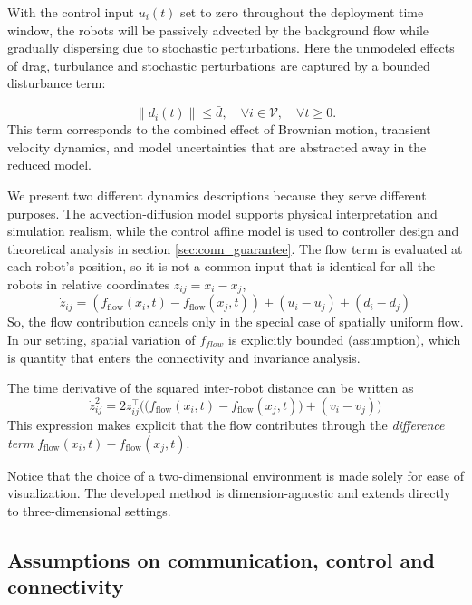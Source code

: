 \documentclass[conference]{IEEEconf}
\theoremstyle{plain}
\begin{document}
With the control input $u_i(t)$ set to zero throughout the deployment time window, the robots will be passively advected by the background flow while gradually dispersing due to stochastic perturbations. Here the unmodeled effects of drag, turbulance and stochastic perturbations are captured by a bounded disturbance term:

$$\|d_i(t)\| \le \bar{d}, \quad \forall i \in \mathcal{V}, \quad \forall t \ge 0. $$
This term corresponds to the combined effect of Brownian motion, transient velocity dynamics, and model uncertainties that are abstracted away in the reduced model.

We present two different dynamics descriptions because they serve different purposes. The advection-diffusion model supports physical interpretation and simulation realism, while the control affine model is used to controller design and theoretical analysis in section \ref{sec:conn_guarantee}. The flow term is evaluated at each robot's position, so it is not a common input that is identical for all the robots in relative coordinates ${z_{ij}} = {x_i} - {x_j}$,
\begin{equation*}
    \dot{z}_{ij} = (f_{\text{flow}}(x_i, t) - f_{\text{flow}}(x_j, t)) + (u_i - u_j) + (d_i - d_j)
\end{equation*}
So, the flow contribution cancels only in the special case of spatially uniform flow. In our setting, spatial variation of $f_{flow}$ is explicitly bounded (assumption), which is quantity that enters the connectivity and invariance analysis.

The time derivative of the squared inter-robot distance can be written as
\begin{equation*}
    \dot{z}_{ij}^2 = 2{z}_{ij}^\top \Big( \big( f_{\text{flow}}(x_i,t) - f_{\text{flow}}(x_j,t) \big) + (v_i - v_j) \Big)
\end{equation*}
This expression makes explicit that the flow contributes through the \textit{difference term} $f_{\text{flow}}(x_i,t)-f_{\text{flow}}(x_j,t)$.


Notice that the choice of a two-dimensional environment is made solely for ease of visualization. The developed method is dimension-agnostic and extends directly to three-dimensional settings.

\subsection{Assumptions on communication, control and connectivity}
\label{subsec:assumptions}
\end{document}
